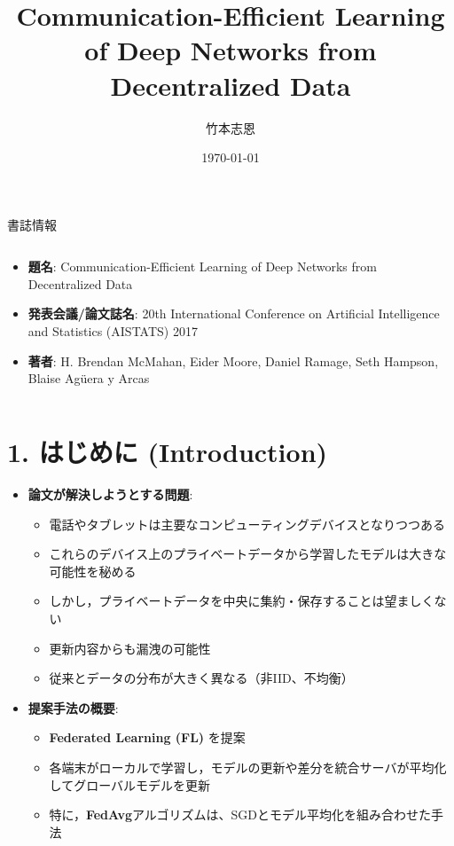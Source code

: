 \documentclass[unicode,12pt,aspectratio=169, dvipdfmx]{beamer}
\title{Communication-Efficient Learning of Deep Networks from Decentralized Data}
\author{竹本志恩}
\date{\today}
\institute{INIAD}
\begin{document}
\frame{\maketitle}


\begin{frame}{書誌情報}
\begin{columns}
\begin{column}{.8\linewidth}
\begin{itemize}
    \item \textbf{題名}: Communication-Efficient Learning of Deep Networks from Decentralized Data
    \item \textbf{発表会議/論文誌名}: 20th International Conference on Artificial Intelligence and Statistics (AISTATS) 2017
    \item \textbf{著者}: H. Brendan McMahan, Eider Moore, Daniel Ramage, Seth Hampson, Blaise Agüera y Arcas
\end{itemize}
\end{column}
\end{columns}
\end{frame}
\section{1. はじめに (Introduction)}
\begin{frame}{\insertsectionhead}
\begin{itemize}
    \item \textbf{論文が解決しようとする問題}:
    \begin{itemize}
        \item 電話やタブレットは主要なコンピューティングデバイスとなりつつある
        \item これらのデバイス上のプライベートデータから学習したモデルは大きな可能性を秘める
        \item しかし，プライベートデータを中央に集約・保存することは望ましくない
        \item 更新内容からも漏洩の可能性
        \item 従来とデータの分布が大きく異なる（非IID、不均衡）
    \end{itemize}
    \item \textbf{提案手法の概要}:
    \begin{itemize}
        \item \textbf{Federated Learning (FL)} を提案
        \item 各端末がローカルで学習し，モデルの更新や差分を統合サーバが平均化してグローバルモデルを更新
        \item 特に，\textbf{FedAvg}アルゴリズムは、SGDとモデル平均化を組み合わせた手法
    \end{itemize}
\end{itemize}
\end{frame}
\end{document}
